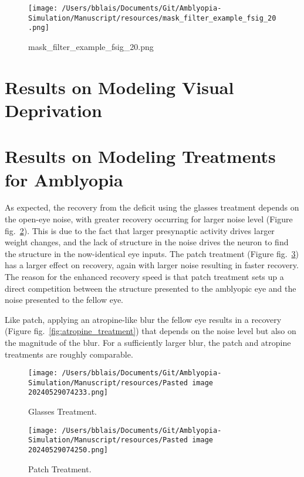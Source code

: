 \documentclass[
]{article}
\begin{document}
\begin{figure}
\centering
\texttt{[image: /Users/bblais/Documents/Git/Amblyopia-Simulation/Manuscript/resources/mask\_filter\_example\_fsig\_20.png]}
\caption{mask\_filter\_example\_fsig\_20.png}\label{figref:mask_filter_example_fsig_20.png}
\end{figure}

\section{Results on Modeling Visual
Deprivation}\label{sec:results-on-modeling-visual-deprivation}

\section{Results on Modeling Treatments for
Amblyopia}\label{sec:results-on-modeling-treatments-for-amblyopia}

As expected, the recovery from the deficit using the glasses treatment
depends on the open-eye noise, with greater recovery occurring for
larger noise level (Figure fig.~\ref{fig:glasses_treatment}). This is
due to the fact that larger presynaptic activity drives larger weight
changes, and the lack of structure in the noise drives the neuron to
find the structure in the now-identical eye inputs. The patch treatment
(Figure fig.~\ref{fig:patch_treatment}) has a larger effect on recovery,
again with larger noise resulting in faster recovery. The reason for the
enhanced recovery speed is that patch treatment sets up a direct
competition between the structure presented to the amblyopic eye and the
noise presented to the fellow eye.

Like patch, applying an atropine-like blur the fellow eye results in a
recovery (Figure fig.~\ref{fig:atropine_treatment}) that depends on the
noise level but also on the magnitude of the blur. For a sufficiently
larger blur, the patch and atropine treatments are roughly comparable.

\begin{figure}
\centering
\texttt{[image: /Users/bblais/Documents/Git/Amblyopia-Simulation/Manuscript/resources/Pasted image 20240529074233.png]}
\caption{Glasses Treatment.}\label{fig:glasses_treatment}
\end{figure}

\begin{figure}
\centering
\texttt{[image: /Users/bblais/Documents/Git/Amblyopia-Simulation/Manuscript/resources/Pasted image 20240529074250.png]}
\caption{Patch Treatment.}\label{fig:patch_treatment}
\end{figure}
\end{document}

